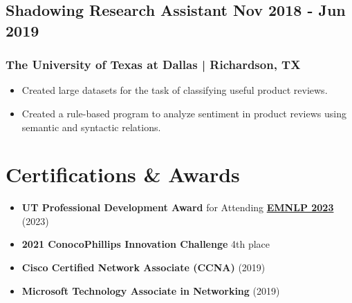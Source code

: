\documentclass[11pt]{article}
\begin{document}
\subsection{Shadowing Research Assistant \hfill \normalfont Nov 2018 - Jun 2019}
\subsubsection{The University of Texas at Dallas | Richardson, TX}
\begin{itemize}
    \item Created large datasets for the task of classifying useful product reviews.
    \item Created a rule-based program to analyze sentiment in product reviews using semantic and syntactic relations.
\end{itemize}
\section{Certifications \& Awards}
\begin{itemize}
    \item \textbf{UT Professional Development Award} for Attending \href{https://2023.emnlp.org/}{\textbf{EMNLP 2023}} (2023)
    \item \textbf{2021 ConocoPhillips Innovation Challenge} 4th place
    \item \textbf{Cisco Certified Network Associate (CCNA)} (2019)
    \item \textbf{Microsoft Technology Associate in Networking} (2019)
\end{itemize}
\end{document}
